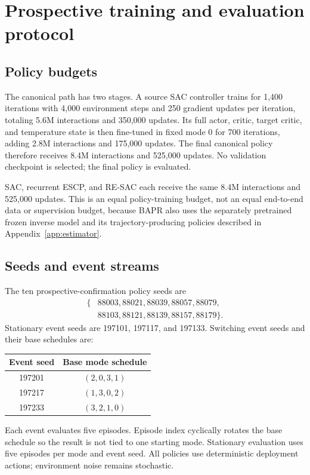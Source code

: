 \section{Prospective training and evaluation protocol}
\label{app:v32_protocol}

\subsection{Policy budgets}

The canonical path has two stages. A source SAC controller trains for 1,400 iterations with 4,000 environment steps and 250 gradient updates per iteration, totaling 5.6M interactions and 350,000 updates. Its full actor, critic, target critic, and temperature state is then fine-tuned in fixed mode 0 for 700 iterations, adding 2.8M interactions and 175,000 updates. The final canonical policy therefore receives 8.4M interactions and 525,000 updates. No validation checkpoint is selected; the final policy is evaluated.

SAC, recurrent ESCP, and RE-SAC each receive the same 8.4M interactions and 525,000 updates. This is an equal policy-training budget, not an equal end-to-end data or supervision budget, because BAPR also uses the separately pretrained frozen inverse model and its trajectory-producing policies described in Appendix~\ref{app:estimator}.

\subsection{Seeds and event streams}

The ten prospective-confirmation policy seeds are
\begin{equation}
\begin{split}
\{&88003,88021,88039,88057,88079,\\
  &88103,88121,88139,88157,88179\}.
\end{split}
\end{equation}
Stationary event seeds are 197101, 197117, and 197133. Switching event seeds and their base schedules are:
\begin{center}
\begin{tabular}{cc}
\toprule
Event seed & Base mode schedule \\
\midrule
197201 & $(2,0,3,1)$ \\
197217 & $(1,3,0,2)$ \\
197233 & $(3,2,1,0)$ \\
\bottomrule
\end{tabular}
\end{center}
Each event evaluates five episodes. Episode index cyclically rotates the base schedule so the result is not tied to one starting mode. Stationary evaluation uses five episodes per mode and event seed. All policies use deterministic deployment actions; environment noise remains stochastic.

